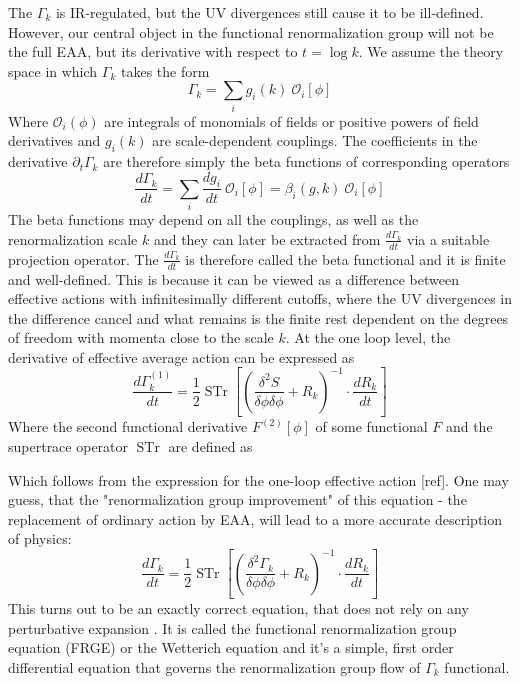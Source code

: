 \documentclass[11pt, a4paper]{article}
\begin{document}
The $\Gamma_k$ is IR-regulated, but the UV divergences still cause it to be ill-defined. 
However, our central object in the functional renormalization group will not be the full EAA, 
but its derivative with respect to $t = \log{k}$.
We assume the theory space in which $\Gamma_k$ takes the form
\begin{equation}
    \Gamma_k = \sum_i g_i(k) \ \mathcal{O}_i [\phi]
    \label{gamma_decomp}
\end{equation}
Where $\mathcal{O}_i (\phi)$ are integrals of monomials of fields or positive powers of field derivatives 
and $g_i(k)$ are scale-dependent couplings.
The coefficients in the derivative $\partial_t \Gamma_k$ are therefore simply the beta functions of corresponding operators
\begin{equation}
    \frac{d \Gamma_k}{dt} = \sum_i \frac{d g_i}{dt} \ \mathcal{O}_i [\phi] = \beta_i(g,k) \ \mathcal{O}_i [\phi]
\end{equation}
The beta functions may depend on all the couplings, as well as the renormalization scale $k$ and
they can later be extracted from $\frac{d \Gamma_k}{dt}$ via a suitable projection operator. 
The $\frac{d \Gamma_k}{dt}$ is therefore called the beta functional and it is finite and well-defined.
This is because it can be viewed as a difference between effective actions with infinitesimally
different cutoffs, where the UV divergences in the difference cancel and what remains is the finite rest
dependent on the degrees of freedom with momenta close to the scale $k$.
At the one loop level, the derivative of effective average action can be expressed as
\begin{equation}
    \frac{d \Gamma_k^{(1)}}{dt} = \frac{1}{2} \operatorname{STr} \left[ \left(\frac{\delta^2 S}{\delta \phi \delta \phi} + R_k\right)^{-1} \cdot \frac{d R_k}{dt} \right]
\end{equation}
Where the second functional derivative $F^(2)[\phi]$ of some functional $F$ and the supertrace operator $ \operatorname{STr}$ are defined as


Which follows from the expression for the one-loop effective action [ref]. 
One may guess, that the "renormalization group improvement" of this equation - the replacement of ordinary action by
 EAA, will lead to a more accurate description of physics:
\begin{equation}
    \frac{d \Gamma_k}{dt} = \frac{1}{2} \operatorname{STr} \left[ \left(\frac{\delta^2 \Gamma_k}{\delta \phi \delta \phi} + R_k\right)^{-1} \cdot \frac{d R_k}{dt} \right]
    \label{FRGE}
\end{equation}
This turns out to be an exactly correct equation, that does not rely on any perturbative expansion \cite{wetteq}.
It is called the functional renormalization group equation (FRGE) or the Wetterich equation and
it's a simple, first order differential equation that governs the renormalization group flow of $\Gamma_k$ functional.
\end{document}
